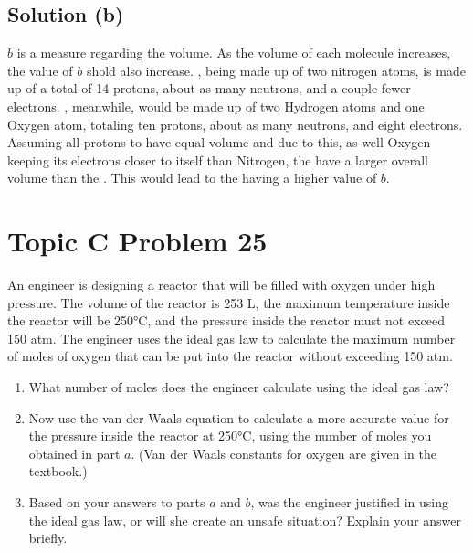 \documentclass[10pt]{article}
\begin{document}
        \subsection{Solution (b)}
            $b$ is a measure regarding the volume. 
            As the volume of each molecule increases, the value of $b$ shold also increase.
            , being made up of two nitrogen atoms, is made up of a total of 14 protons, about as many neutrons, and a couple fewer electrons. 
            , meanwhile, would be made up of two Hydrogen atoms and one Oxygen atom, totaling ten protons, about as many neutrons, and eight electrons. 
            Assuming all protons to have equal volume and due to this, as well Oxygen keeping its electrons closer to itself than Nitrogen, the  have a larger overall volume than the . 
            This would lead to the  having a higher value of $b$. 

    \pagebreak
    \section{Topic C Problem 25}
        An engineer is designing a reactor that will be filled with oxygen under high pressure. 
        The volume of the reactor is 253 L, the maximum temperature inside the reactor will be 250\unit{\celsius}, and the pressure inside the reactor must not exceed 150 atm. 
        The engineer uses the ideal gas law to calculate the maximum number of moles of oxygen that can be put into the reactor without exceeding 150 atm.

        \begin{enumerate} [label=\alph*)]
            \item What number of moles does the engineer calculate using the ideal gas law?
            \item Now use the van der Waals equation to calculate a more accurate value for the pressure inside the reactor at 250\unit{\celsius}, using the number of moles you obtained in part $a$. (Van der Waals constants for oxygen are given in the textbook.)
            \item Based on your answers to parts $a$ and $b$, was the engineer justified in using the ideal gas law, or will she create an unsafe situation? Explain your answer briefly.
        \end{enumerate}
\end{document}
